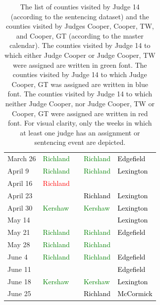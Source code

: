 \documentclass[11pt, oneside]{article}   	%
\theoremstyle{ModifiedStyle}
\begin{document}
\begin{table}[H]
{\begin{tabular}{L{23mm}C{55mm}C{38mm}C{38mm}C{38mm}}
			\rule{0pt}{2.3ex} March 26 &  \textcolor{green}{Richland} & & \textcolor{green}{Richland} &  \textcolor{black}{Edgefield}\\
			\rule{0pt}{2.3ex} April 9 &  \textcolor{green}{Richland} & & \textcolor{green}{Richland} &  \textcolor{black}{Lexington}\\
			\rule{0pt}{2.3ex} April 16 &  \textcolor{red}{Richland} & & &\\
			\rule{0pt}{2.3ex} April 23 & & & \textcolor{black}{Richland} &  \textcolor{black}{Lexington}\\
			\rule{0pt}{2.3ex} April 30 &  \textcolor{green}{Kershaw} & & \textcolor{green}{Kershaw} &  \textcolor{black}{Lexington}\\
			\rule{0pt}{2.3ex} May 14 & & & &  \textcolor{black}{Lexington}\\\rule{0pt}{2.3ex} May 21 &  \textcolor{green}{Richland} & & \textcolor{green}{Richland} &  \textcolor{black}{Edgefield}\\
			\rule{0pt}{2.3ex} May 28 &  \textcolor{green}{Richland} & & \textcolor{green}{Richland} &\\
			\rule{0pt}{2.3ex} June 4 &  \textcolor{green}{Richland} & & \textcolor{green}{Richland} &  \textcolor{black}{Edgefield}\\
			\rule{0pt}{2.3ex} June 11 & & & &  \textcolor{black}{Edgefield}\\\rule{0pt}{2.3ex} June 18 &  \textcolor{green}{Kershaw} & & \textcolor{green}{Kershaw} &  \textcolor{black}{Lexington}\\
			\rule{0pt}{2.3ex} June 25 & & & \textcolor{black}{Richland} &  \textcolor{black}{McCormick}\\
			\bottomrule
		\end{tabular}
	}
	\vspace{-1mm}
	\caption{The list of counties visited by Judge 14 (according to the sentencing dataset) and the counties visited by Judges Cooper, Cooper, TW, and Cooper, GT (according to the master calendar). The counties visited by Judge 14 to which either Judge Cooper or Judge Cooper, TW were assigned are written in green font. The counties visited by Judge 14 to which Judge Cooper, GT was assigned are written in blue font. The counties visited by Judge 14 to which neither Judge Cooper, nor Judge Cooper, TW or Cooper, GT were assigned are written in red font. For visual clarity, only the weeks in which at least one judge has an assignment or sentencing event are depicted.}
	\label{Table_Coopers_Schedules}
	\vspace{-2mm}
\end{table}
\end{document}
